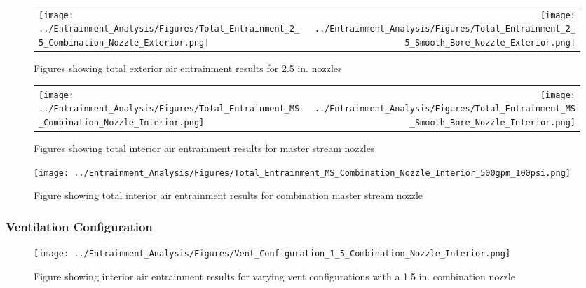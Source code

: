 \documentclass{article}
\begin{document}
\begin{appendices}
\begin{figure}[!ht]
\begin{tabular*}{\textwidth}{lr}
\texttt{[image: ../Entrainment\_Analysis/Figures/Total\_Entrainment\_2\_5\_Combination\_Nozzle\_Exterior.png]} &
\texttt{[image: ../Entrainment\_Analysis/Figures/Total\_Entrainment\_2\_5\_Smooth\_Bore\_Nozzle\_Exterior.png]} \\
\end{tabular*}
\caption{Figures showing total exterior air entrainment results for 2.5 in. nozzles}
\label{fig:2_5_Exterior_Total_Entrainment}
\end{figure}

\clearpage

\begin{figure}[!ht]
\begin{tabular*}{\textwidth}{lr}
\texttt{[image: ../Entrainment\_Analysis/Figures/Total\_Entrainment\_MS\_Combination\_Nozzle\_Interior.png]} &
\texttt{[image: ../Entrainment\_Analysis/Figures/Total\_Entrainment\_MS\_Smooth\_Bore\_Nozzle\_Interior.png]} \\
\end{tabular*}
\caption{Figures showing total interior air entrainment results for master stream nozzles}
\label{fig:MS_Interior_Total_Entrainment}
\end{figure}

\begin{figure}[!ht]
\centering
\texttt{[image: ../Entrainment\_Analysis/Figures/Total\_Entrainment\_MS\_Combination\_Nozzle\_Interior\_500gpm\_100psi.png]}
\caption{Figure showing total interior air entrainment results for combination master stream nozzle}
\label{fig:MS_Interior_Total_Entrainment_Combination}
\end{figure}

\clearpage

\subsubsection{Ventilation Configuration}

\begin{figure}[!ht]
\centering
\texttt{[image: ../Entrainment\_Analysis/Figures/Vent\_Configuration\_1\_5\_Combination\_Nozzle\_Interior.png]}
\caption{Figure showing interior air entrainment results for varying vent configurations with a 1.5 in. combination nozzle}
\label{fig:1_5_Interior_Combination_Vent_Config}
\end{figure}

\clearpage


\end{appendices}
\end{document}

